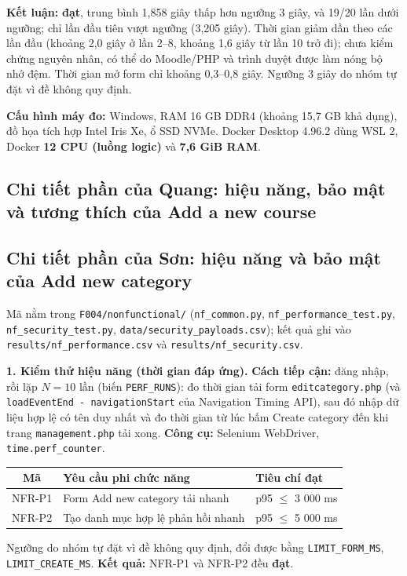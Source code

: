 \documentclass[12pt,a4paper]{article}
\begin{document}
\textbf{Kết luận:} \textbf{đạt}, trung bình 1,858 giây thấp hơn ngưỡng 3 giây, và 19/20 lần dưới ngưỡng; chỉ lần đầu tiên vượt ngưỡng (3,205 giây). Thời gian giảm dần theo các lần đầu (khoảng 2,0 giây ở lần 2--8, khoảng 1,6 giây từ lần 10 trở đi); chưa kiểm chứng nguyên nhân, có thể do Moodle/PHP và trình duyệt được làm nóng bộ nhớ đệm. Thời gian mở form chỉ khoảng 0,3--0,8 giây. Ngưỡng 3 giây do nhóm tự đặt vì đề không quy định. 

\textbf{Cấu hình máy đo:} Windows, RAM 16 GB DDR4 (khoảng 15,7 GB khả dụng), đồ họa tích hợp Intel Iris Xe, ổ SSD NVMe. Docker Desktop 4.96.2 dùng WSL 2, Docker \textbf{12 CPU (luồng logic)} và \textbf{7,6 GiB RAM}.

\subsection{Chi tiết phần của Quang: hiệu năng, bảo mật và tương thích của Add a new course}


\subsection{Chi tiết phần của Sơn: hiệu năng và bảo mật của Add new category}
Mã nằm trong \texttt{F004/nonfunctional/} (\texttt{nf\_common.py}, \texttt{nf\_performance\_test.py}, \texttt{nf\_security\_test.py}, \texttt{data/security\_payloads.csv}); kết quả ghi vào \texttt{results/nf\_performance.csv} và \texttt{results/nf\_security.csv}.

\textbf{1. Kiểm thử hiệu năng (thời gian đáp ứng).} \textbf{Cách tiếp cận:} đăng nhập, rồi lặp $N=10$ lần (biến \texttt{PERF\_RUNS}): đo thời gian tải form \texttt{editcategory.php} (và \texttt{loadEventEnd - navigationStart} của Navigation Timing API), sau đó nhập dữ liệu hợp lệ có tên duy nhất và đo thời gian từ lúc bấm Create category đến khi trang \texttt{management.php} tải xong. \textbf{Công cụ:} Selenium WebDriver, \texttt{time.perf\_counter}.
\begin{center}\small
\begin{tabular}{|c|L{7.0cm}|L{3.4cm}|}\hline
{}\textbf{Mã} & \textbf{Yêu cầu phi chức năng} & \textbf{Tiêu chí đạt} \\ \hline
NFR-P1 & Form Add new category tải nhanh & p95 $\le$ 3 000 ms \\ \hline
NFR-P2 & Tạo danh mục hợp lệ phản hồi nhanh & p95 $\le$ 5 000 ms \\ \hline
\end{tabular}\end{center}
Ngưỡng do nhóm tự đặt vì đề không quy định, đổi được bằng \texttt{LIMIT\_FORM\_MS}, \texttt{LIMIT\_CREATE\_MS}. \textbf{Kết quả:} NFR-P1 và NFR-P2 đều \textbf{đạt}.
\end{document}
